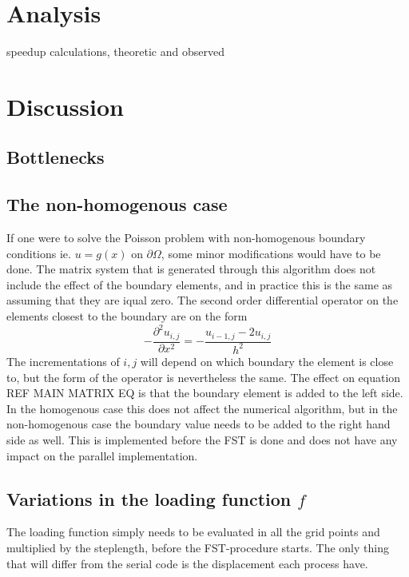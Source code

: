 \documentclass[norsk]{article} %
\numberwithin{equation}{section} %
\numberwithin{figure}{section} %
\numberwithin{table}{section} %
\begin{document}
\section{Analysis}

speedup calculations, theoretic and observed

\section{Discussion}

\subsection{Bottlenecks}

\subsection{The non-homogenous case}
If one were to solve the Poisson problem with non-homogenous boundary conditions ie. $u = g(x) $ on $\partial \Omega$, 
some minor modifications would have to be done. 
The matrix system that is generated through this algorithm does not include the effect of the boundary elements, 
and in practice this is the same as assuming that they are iqual zero. The second order differential operator on the elements 
closest to the boundary are on the form 
\begin{equation}
	-\frac{\partial^2 u_{i,j}}{\partial x^2} = -\frac{u_{i-1,j}-2u_{i,j}}{h^2}
\end{equation}
The incrementations of $i,j$ will depend on which boundary the element is close to, but the form of the operator is nevertheless the same.
The effect on equation REF MAIN MATRIX EQ is that the boundary element is added to the left side.
In the homogenous case this does not affect the numerical algorithm, but in the non-homogenous case the boundary value needs to be added to the 
right hand side as well. This is implemented before the FST is done and does not have any impact on the parallel implementation. 
\subsection{Variations in the loading function $f$}
The loading function simply needs to be evaluated in all the grid points and multiplied by the steplength, before the 
FST-procedure starts. The only thing that will differ from the serial code is the displacement each process have.
\end{document}
